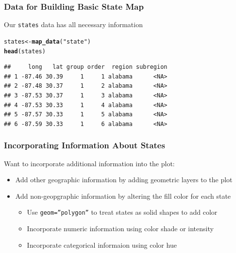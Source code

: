 \documentclass{beamer}\usepackage[]{graphicx}\usepackage[]{color}
\makeatletter
\newcommand{\hlstr}[1]{\textcolor[rgb]{0.192,0.494,0.8}{#1}}%
\newcommand{\hlstd}[1]{\textcolor[rgb]{0.345,0.345,0.345}{#1}}%
\newcommand{\hlkwb}[1]{\textcolor[rgb]{0.69,0.353,0.396}{#1}}%
\newcommand{\hlkwd}[1]{\textcolor[rgb]{0.737,0.353,0.396}{\textbf{#1}}}%
\newenvironment{kframe}{%
 \def\at@end@of@kframe{}%
 \ifinner\ifhmode%
  \def\at@end@of@kframe{\end{minipage}}%
  \begin{minipage}{\columnwidth}%
 \fi\fi%
 \def\FrameCommand##1{\hskip\@totalleftmargin \hskip-\fboxsep
 \colorbox{shadecolor}{##1}\hskip-\fboxsep
     \hskip-\linewidth \hskip-\@totalleftmargin \hskip\columnwidth}%
 \MakeFramed {\advance\hsize-\width
   \@totalleftmargin\z@ \linewidth\hsize
   \@setminipage}}%
 {\par\unskip\endMakeFramed%
 \at@end@of@kframe}
\newenvironment{knitrout}{}{} %
\makeatother
\begin{document}
\begin{frame}[fragile]
    \frametitle{Data for Building Basic State Map}
    
 Our \texttt{states} data has all necessary information
    
    \small
\begin{knitrout}\footnotesize
{}\color{fgcolor}\begin{kframe}
\begin{alltt}
\hlstd{states} \hlkwb{<-} \hlkwd{map_data}\hlstd{(}\hlstr{"state"}\hlstd{)}
\hlkwd{head}\hlstd{(states)}
\end{alltt}
\begin{verbatim}
##     long   lat group order  region subregion
## 1 -87.46 30.39     1     1 alabama      <NA>
## 2 -87.48 30.37     1     2 alabama      <NA>
## 3 -87.53 30.37     1     3 alabama      <NA>
## 4 -87.53 30.33     1     4 alabama      <NA>
## 5 -87.57 30.33     1     5 alabama      <NA>
## 6 -87.59 30.33     1     6 alabama      <NA>
\end{verbatim}
\end{kframe}
\end{knitrout}
    \normalsize
\end{frame}



\begin{frame}
    \frametitle{Incorporating Information About States}
  Want to incorporate additional information into the plot:
    \begin{itemize}
        \item Add other geographic information by adding geometric layers to the plot
        \item Add non-geopgraphic information by altering the fill color for each state
      \begin{itemize}
        \item Use \texttt{geom=''polygon''} to treat states as solid shapes to add color
        \item Incorporate numeric information using color shade or intensity
        \item Incorporate categorical informaion using color hue
      \end{itemize}
    \end{itemize}    
\end{frame}

\end{document}
